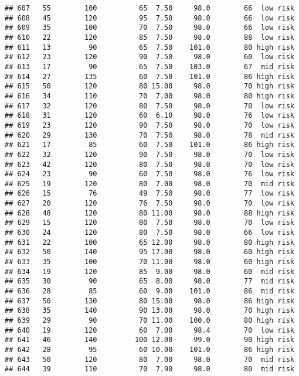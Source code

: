 \documentclass[
  ignorenonframetext,
]{beamer}
\begin{document}
\begin{frame}[fragile]
\begin{verbatim}
## 607   55        100          65  7.50     98.0        66  low risk
## 608   45        120          95  7.50     98.0        66  low risk
## 609   35        100          70  7.50     98.0        66  low risk
## 610   22        120          85  7.50     98.0        88  low risk
## 611   13         90          65  7.50    101.0        80 high risk
## 612   23        120          90  7.50     98.0        60  low risk
## 613   17         90          65  7.50    103.0        67  mid risk
## 614   27        135          60  7.50    101.0        86 high risk
## 615   50        120          80 15.00     98.0        70 high risk
## 616   34        110          70  7.00     98.0        80 high risk
## 617   32        120          80  7.50     98.0        70  low risk
## 618   31        120          60  6.10     98.0        76  low risk
## 619   23        120          90  7.50     98.0        70  low risk
## 620   29        130          70  7.50     98.0        78  mid risk
## 621   17         85          60  7.50    101.0        86 high risk
## 622   32        120          90  7.50     98.0        70  low risk
## 623   42        120          80  7.50     98.0        70  low risk
## 624   23         90          60  7.50     98.0        76  low risk
## 625   19        120          80  7.00     98.0        70  mid risk
## 626   15         76          49  7.50     98.0        77  low risk
## 627   20        120          76  7.50     98.0        70  low risk
## 628   48        120          80 11.00     98.0        88 high risk
## 629   15        120          80  7.50     98.0        70  low risk
## 630   24        120          80  7.50     98.0        66  low risk
## 631   22        100          65 12.00     98.0        80 high risk
## 632   50        140          95 17.00     98.0        60 high risk
## 633   35        100          70 11.00     98.0        60 high risk
## 634   19        120          85  9.00     98.0        60  mid risk
## 635   30         90          65  8.00     98.0        77  mid risk
## 636   28         85          60  9.00    101.0        86  mid risk
## 637   50        130          80 15.00     98.0        86 high risk
## 638   35        140          90 13.00     98.0        70 high risk
## 639   29         90          70 11.00    100.0        80 high risk
## 640   19        120          60  7.00     98.4        70  low risk
## 641   46        140         100 12.00     99.0        90 high risk
## 642   28         95          60 10.00    101.0        86 high risk
## 643   50        120          80  7.00     98.0        70  mid risk
## 644   39        110          70  7.90     98.0        80  mid risk

\end{verbatim}
\end{frame}
\end{document}
